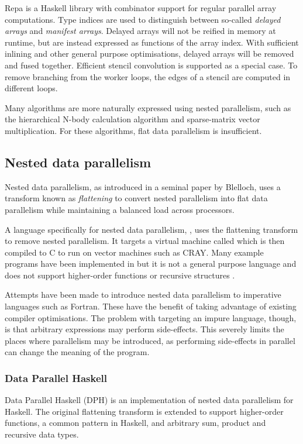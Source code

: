 Repa is a Haskell library with combinator support for regular parallel array computations\cite{keller2010regular}.
Type indices are used to distinguish between so-called \emph{delayed arrays} and \emph{manifest arrays}.
Delayed arrays will not be reified in memory at runtime, but are instead expressed as functions of the array index.
With sufficient inlining and other general purpose optimisations, delayed arrays will be removed and fused together\cite{lippmeier2012guiding}.
Efficient stencil convolution is supported as a special case.
To remove branching from the worker loops, the edges of a stencil are computed in different loops\cite{lippmeier2011efficient}.

Many algorithms are more naturally expressed using nested parallelism, such as the hierarchical N-body calculation\cite{barnes1986hierarchical} algorithm and sparse-matrix vector multiplication.
For these algorithms, flat data parallelism is insufficient.


\subsection{Nested data parallelism}
Nested data parallelism, as introduced in a seminal paper by Blelloch\cite{blelloch1990vector},
uses a transform known as \emph{flattening} to convert nested parallelism into flat data parallelism
while maintaining a balanced load across processors.

A language specifically for nested data parallelism, \nesl\cite{blelloch1995nesl},
uses the flattening transform to remove nested parallelism.
It targets a virtual machine called \vcode\cite{blelloch1993implementation}
which is then compiled to C to run on vector machines such as CRAY.
Many example programs have been implemented in \nesl\cite{blelloch1996programming}
but it is not a general purpose language and does not support higher-order functions\cite{leshchinskiy2005higher} or recursive structures \cite{keller1998flattening}.

Attempts have been made to introduce nested data parallelism to imperative languages such as Fortran\cite{au1997enlarging}.
These have the benefit of taking advantage of existing compiler optimisations.
The problem with targeting an impure language, though,
is that arbitrary expressions may perform side-effects.
This severely limits the places where parallelism may be introduced, as performing side-effects in parallel can change the meaning of the program.

\subsubsection{Data Parallel Haskell}
Data Parallel Haskell (DPH) is an implementation of nested data parallelism for Haskell\cite{chakravarty2007data}.
The original flattening transform is extended to support higher-order functions\cite{leshchinskiy2006higher}, a common pattern in Haskell,
and arbitrary sum, product and recursive data types\cite{chakravarty2000more}.

